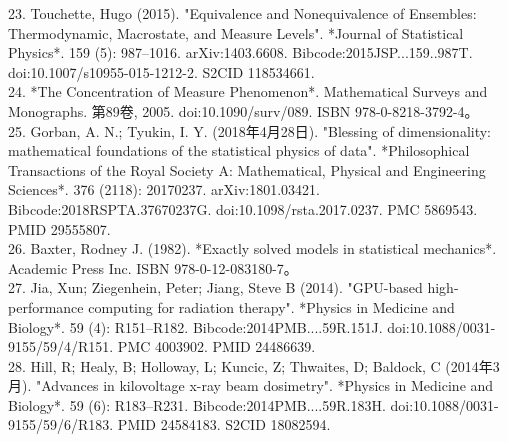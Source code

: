 23. Touchette, Hugo (2015). "Equivalence and Nonequivalence of Ensembles: Thermodynamic, Macrostate, and Measure Levels". *Journal of Statistical Physics*. 159 (5): 987–1016. arXiv:1403.6608. Bibcode:2015JSP...159..987T. doi:10.1007/s10955-015-1212-2. S2CID 118534661.\\
24. *The Concentration of Measure Phenomenon*. Mathematical Surveys and Monographs. 第89卷, 2005. doi:10.1090/surv/089. ISBN 978-0-8218-3792-4。\\
25. Gorban, A. N.; Tyukin, I. Y. (2018年4月28日). "Blessing of dimensionality: mathematical foundations of the statistical physics of data". *Philosophical Transactions of the Royal Society A: Mathematical, Physical and Engineering Sciences*. 376 (2118): 20170237. arXiv:1801.03421. Bibcode:2018RSPTA.37670237G. doi:10.1098/rsta.2017.0237. PMC 5869543. PMID 29555807.\\
26. Baxter, Rodney J. (1982). *Exactly solved models in statistical mechanics*. Academic Press Inc. ISBN 978-0-12-083180-7。\\
27. Jia, Xun; Ziegenhein, Peter; Jiang, Steve B (2014). "GPU-based high-performance computing for radiation therapy". *Physics in Medicine and Biology*. 59 (4): R151–R182. Bibcode:2014PMB....59R.151J. doi:10.1088/0031-9155/59/4/R151. PMC 4003902. PMID 24486639.\\
28. Hill, R; Healy, B; Holloway, L; Kuncic, Z; Thwaites, D; Baldock, C (2014年3月). "Advances in kilovoltage x-ray beam dosimetry". *Physics in Medicine and Biology*. 59 (6): R183–R231. Bibcode:2014PMB....59R.183H. doi:10.1088/0031-9155/59/6/R183. PMID 24584183. S2CID 18082594.\\